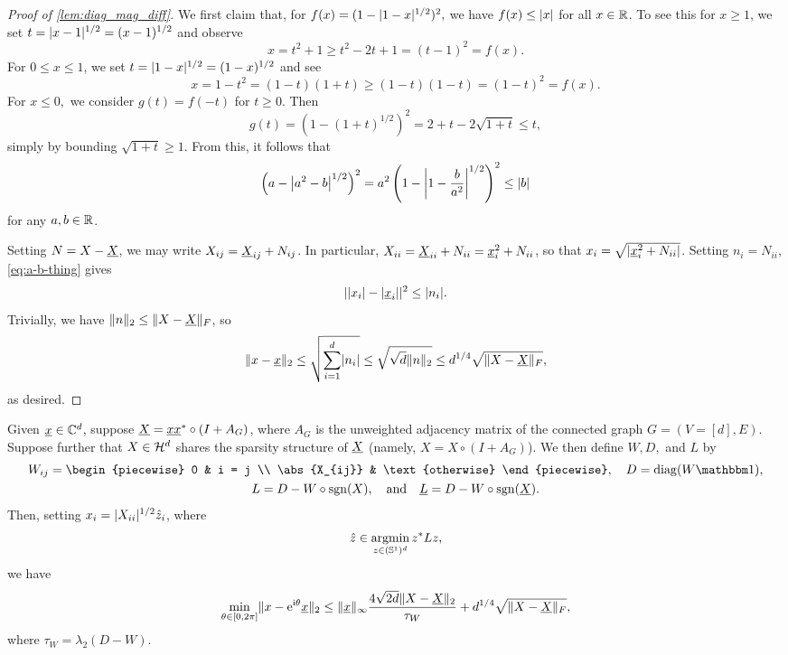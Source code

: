 \begin{proof}[Proof of \cref{lem:diag_mag_diff}]
  We first claim that, for $f(x) = (1 - \abs{1 - x}^{1 / 2})^2,$ we have $f(x) \le \abs{x}$ for all $x \in \R$.  To see this for $x \ge 1$, we set $t = \abs{x - 1}^{1/2} = (x - 1)^{1/2}$ and observe \[x = t^2 + 1 \ge t^2 - 2t + 1 = (t - 1)^2 = f(x).\]  For $0 \le x \le 1$, we set $t = \abs{1 - x}^{1 / 2} = (1 - x)^{1 / 2}$ and see \[x = 1 - t^2 = (1 - t) (1 + t) \ge (1 - t) (1 - t) = (1 - t)^2 = f(x).\]  For $x \le 0,$ we consider $g(t) = f(-t)$ for $t \ge 0$.  Then \[g(t) = (1 - (1 + t)^{1 / 2})^2 = 2 + t - 2\sqrt{1 + t} \le t,\] simply by bounding $\sqrt{1 + t} \ge 1$.  From this, it follows that \begin{equation} \left(a - \abs*{a^2 - b}^{1 / 2}\right)^2 = a^2 \left(1 - \abs*{1 - \frac{b}{a^2}}^{1 / 2}\right)^2 \le \abs{b} \label{eq:a-b-thing} \end{equation} for any $a, b \in \R$.
  
  Setting $N = X - \uX$, we may write $X_{ij} = \uX_{ij} + N_{ij}$.  In particular, $X_{ii} = \uX_{ii} + N_{ii} = \ux_i^2 + N_{ii}$, so that $x_i = \sqrt{\abs{\ux_i^2 + N_{ii}}}$.  Setting $n_i = N_{ii}$, \eqref{eq:a-b-thing} gives \[\abs{\abs{x_i} - \abs{\ux_i}}^2 \le \abs{n_i}.\]  Trivially, we have $\norm{n}_2 \le \norm{X - \uX}_F$, so \[\norm{x - \ux}_2 \le \sqrt{\sum_{i = 1}^d \abs{n_i}} \le \sqrt{\sqrt{d} \norm{n}_2} \le d^{1 / 4} \sqrt{\norm{X - \uX}_F},\] as desired.
\end{proof}

\begin{corollary}
  Given $\ux \in \C^d$, suppose $\uX = \ux \ux^* \circ (I + A_G)$, where $A_G$ is the unweighted adjacency matrix of the connected graph $G = (V = [d], E)$.  Suppose further that $X \in \H^d$ shares the sparsity structure of $\uX$ (namely, $X = X \circ (I + A_G)$).  We then define $W, D,$ and $L$ by \begin{gather*} W_{ij} = \begin{piecewise} 0 & i = j \\ \abs{X_{ij}} & \text{otherwise} \end{piecewise}, \quad D = \diag(W \one), \\ L = D - W \circ \sgn(X), \quad \text{and} \quad \uL = D - W \circ \sgn(\uX).\end{gather*}  Then, setting $x_i = |X_{ii}|^{1/2} \hz_i$, where \[\hz \in \argmin_{z \in (\Sbb^1)^d} z^* L z,\] we have \begin{equation} \min_{\theta \in [0, 2 \pi]} \norm{x - \ee^{\ii \theta} \ux}_2 \le \norm{\ux}_\infty \dfrac{4 \sqrt{2d} \norm{X - \uX}_2}{\tau_W} + d^{1 / 4} \sqrt{\norm{X - \uX}_F}, \label{eq:ang_sync_weighted}\end{equation} where $\tau_W = \lambda_2(D - W)$.
  \label{thm:ang_sync_weighted}
\end{corollary}

